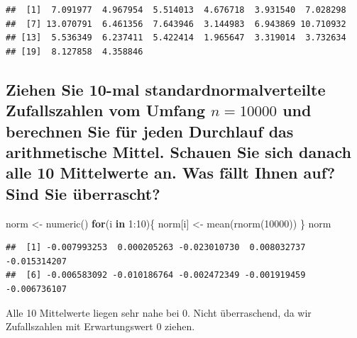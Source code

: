 \documentclass[12pt,a4paper]{article}
\newenvironment{Shaded}{\begin{snugshade}}{\end{snugshade}}
\newcommand{\ControlFlowTok}[1]{\textcolor[rgb]{0.13,0.29,0.53}{\textbf{#1}}}
\newcommand{\DecValTok}[1]{\textcolor[rgb]{0.00,0.00,0.81}{#1}}
\newcommand{\FunctionTok}[1]{\textcolor[rgb]{0.00,0.00,0.00}{#1}}
\newcommand{\NormalTok}[1]{#1}
\newcommand{\OtherTok}[1]{\textcolor[rgb]{0.56,0.35,0.01}{#1}}
\newcommand{\SpecialCharTok}[1]{\textcolor[rgb]{0.00,0.00,0.00}{#1}}
\begin{document}
\begin{verbatim}
##  [1]  7.091977  4.967954  5.514013  4.676718  3.931540  7.028298
##  [7] 13.070791  6.461356  7.643946  3.144983  6.943869 10.710932
## [13]  5.536349  6.237411  5.422414  1.965647  3.319014  3.732634
## [19]  8.127858  4.358846
\end{verbatim}

\hypertarget{ziehen-sie-10-mal-standardnormalverteilte-zufallszahlen-vom-umfang-n-10000-und-berechnen-sie-fuxfcr-jeden-durchlauf-das-arithmetische-mittel.-schauen-sie-sich-danach-alle-10-mittelwerte-an.-was-fuxe4llt-ihnen-auf-sind-sie-uxfcberrascht}{%
\subsection{\texorpdfstring{Ziehen Sie 10-mal standardnormalverteilte
Zufallszahlen vom Umfang \(n = 10000\) und berechnen Sie für jeden
Durchlauf das arithmetische Mittel. Schauen Sie sich danach alle 10
Mittelwerte an. Was fällt Ihnen auf? Sind Sie
überrascht?}{Ziehen Sie 10-mal standardnormalverteilte Zufallszahlen vom Umfang n = 10000 und berechnen Sie für jeden Durchlauf das arithmetische Mittel. Schauen Sie sich danach alle 10 Mittelwerte an. Was fällt Ihnen auf? Sind Sie überrascht?}}\label{ziehen-sie-10-mal-standardnormalverteilte-zufallszahlen-vom-umfang-n-10000-und-berechnen-sie-fuxfcr-jeden-durchlauf-das-arithmetische-mittel.-schauen-sie-sich-danach-alle-10-mittelwerte-an.-was-fuxe4llt-ihnen-auf-sind-sie-uxfcberrascht}}

\begin{Shaded}
\begin{Highlighting}[]
\NormalTok{    norm }\OtherTok{\textless{}{-}} \FunctionTok{numeric}\NormalTok{()}
    \ControlFlowTok{for}\NormalTok{(i }\ControlFlowTok{in} \DecValTok{1}\SpecialCharTok{:}\DecValTok{10}\NormalTok{)\{}
\NormalTok{      norm[i] }\OtherTok{\textless{}{-}} \FunctionTok{mean}\NormalTok{(}\FunctionTok{rnorm}\NormalTok{(}\DecValTok{10000}\NormalTok{))}
\NormalTok{    \}}
\NormalTok{    norm}
\end{Highlighting}
\end{Shaded}

\begin{verbatim}
##  [1] -0.007993253  0.000205263 -0.023010730  0.008032737 -0.015314207
##  [6] -0.006583092 -0.010186764 -0.002472349 -0.001919459 -0.006736107
\end{verbatim}

Alle 10 Mittelwerte liegen sehr nahe bei 0. Nicht überraschend, da wir
Zufallszahlen mit Erwartungswert 0 ziehen.
\end{document}

